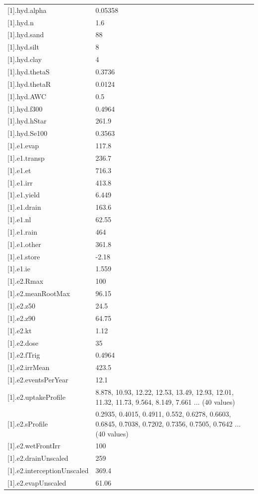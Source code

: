 {\begin{longtable}{p{}p{}}
{}[1].hyd.alpha & 0.05358\\
{}[1].hyd.n & 1.6\\
{}[1].hyd.sand & 88\\
{}[1].hyd.silt & 8\\
{}[1].hyd.clay & 4\\
{}[1].hyd.thetaS & 0.3736\\
{}[1].hyd.thetaR & 0.0124\\
{}[1].hyd.AWC & 0.5\\
{}[1].hyd.f300 & 0.4964\\
{}[1].hyd.hStar & 261.9\\
{}[1].hyd.Se100 & 0.3563\\
{}[1].e1.evap & 117.8\\
{}[1].e1.transp & 236.7\\
{}[1].e1.et & 716.3\\
{}[1].e1.irr & 413.8\\
{}[1].e1.yield & 6.449\\
{}[1].e1.drain & 163.6\\
{}[1].e1.nl & 62.55\\
{}[1].e1.rain & 464\\
{}[1].e1.other & 361.8\\
{}[1].e1.store & -2.18\\
{}[1].e1.ie & 1.559\\
{}[1].e2.Rmax & 100\\
{}[1].e2.meanRootMax & 96.15\\
{}[1].e2.z50 & 24.5\\
{}[1].e2.z90 & 64.75\\
{}[1].e2.kt & 1.12\\
{}[1].e2.dose & 35\\
{}[1].e2.fTrig & 0.4964\\
{}[1].e2.irrMean & 423.5\\
{}[1].e2.eventsPerYear & 12.1\\
{}[1].e2.uptakeProfile & 8.878, 10.93, 12.22, 12.53, 13.49, 12.93, 12.01, 11.32, 11.73, 9.564, 8.149, 7.661 ... (40 values)\\
{}[1].e2.sProfile & 0.2935, 0.4015, 0.4911, 0.552, 0.6278, 0.6603, 0.6845, 0.7038, 0.7202, 0.7356, 0.7505, 0.7642 ... (40 values)\\
{}[1].e2.wetFrontIrr & 100\\
{}[1].e2.drainUnscaled & 259\\
{}[1].e2.interceptionUnscaled & 369.4\\
{}[1].e2.evapUnscaled & 61.06\\

\end{longtable}}
